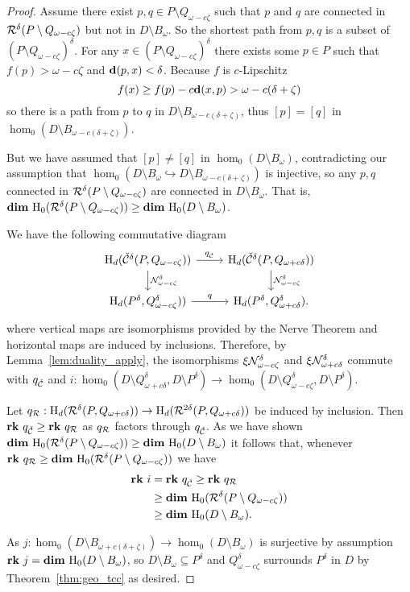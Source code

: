 \begin{proof}
  Assume there exist $p,q \in P\setminus Q_{\omega-c\zeta}$ such that $p$ and $q$ are connected in $\mathcal{R}^\delta(P\setminus Q_{\omega-c\zeta})$ but not in $D\setminus B_\omega$.
  So the shortest path from $p, q$ is a subset of $(P\setminus Q_{\omega-c\zeta})^\delta$.
  For any $x\in (P\setminus Q_{\omega-c\zeta})^\delta$ there exists some $p\in P$ such that $f(p) > \omega - c\zeta$ and $\mathbf{d}(p,x) < \delta$.
  Because $f$ is $c$-Lipschitz
  \[ f(x)\geq f(p) - c\mathbf{d}(x,p) > \omega - c(\delta+\zeta)\]
  so there is a path from $p$ to $q$ in $D\setminus B_{\omega-c(\delta+\zeta)}$, thus $[p] = [q]$ in $\hom_0(D\setminus B_{\omega-c(\delta+\zeta)})$.

  But we have assumed that $[p]\neq[q]$ in $\hom_0(D\setminus B_\omega)$, contradicting our assumption that $\hom_0(D\setminus B_\omega\hookrightarrow D\setminus B_{\omega-c(\delta+\zeta)})$ is injective, so any $p,q$ connected in $\mathcal{R}^\delta(P\setminus Q_{\omega-c\zeta})$ are connected in $D\setminus B_\omega$.
  That is, $\mathbf{dim}~\mathrm{H}_0(\mathcal{R}^\delta(P\setminus Q_{\omega-c\zeta}))\geq \mathbf{dim}~\mathrm{H}_0(D\setminus B_\omega)$.

  We have the following commutative diagram
  \[\begin{tikzcd}
    \hom_d(\cech^\delta(P, Q_{\omega-c\zeta})) \arrow{r}{q_{\cech}}\arrow{d}{\N_{\omega-c\zeta}^{\delta}} &
    \hom_d(\cech^\delta(P, Q_{\omega+c\delta})) \arrow{d}{\N_{\omega-c\zeta}^\delta}\\
    \hom_d(P^\delta, Q_{\omega-c\zeta}^\delta))\arrow{r}{q} &
    \hom_d(P^\delta, Q_{\omega+c\delta}^\delta).
  \end{tikzcd}\]
  where vertical maps are isomorphisms provided by the Nerve Theorem and horizontal maps are induced by inclusions.
  Therefore, by Lemma~\ref{lem:duality_apply}, the isomorphisms $\xi\mathcal{N}_{\omega-c\zeta}^\delta$ and $\xi\mathcal{N}_{\omega+c\delta}^\delta$ commute with $q_{\check{\mathcal{C}}}$ and $i : \hom_0(D\setminus Q_{\omega+c\delta}^\delta, D\setminus P^\delta)\to \hom_0(D\setminus Q_{\omega-c\zeta}^\delta, D\setminus P^\delta)$.

  Let $q_{\mathcal{R}} : \mathrm{H}_d(\mathcal{R}^{\delta}(P, Q_{\omega+c\delta}))\to\mathrm{H}_d(\mathcal{R}^{2\delta}(P, Q_{\omega+c\delta}))$ be induced by inclusion.
  Then $\mathbf{rk}~q_{\check{\mathcal{C}}} \geq\mathbf{rk}~q_{\mathcal{R}}$ as $q_{\mathcal{R}}$ factors through $q_{\check{\mathcal{C}}}$.
  As we have shown $\mathbf{dim}~\mathrm{H}_0(\mathcal{R}^\delta(P\setminus Q_{\omega-c\zeta}))\geq \mathbf{dim}~\mathrm{H}_0(D\setminus B_\omega)$ it follows that, whenever $\mathbf{rk}~q_{\mathcal{R}} \geq \mathbf{dim}~\mathrm{H}_0(\mathcal{R}^\delta(P\setminus Q_{\omega-c\zeta}))$ we have
  \begin{align*}
    \mathbf{rk}~i &= \mathbf{rk}~q_{\check{\mathcal{C}}} \geq \mathbf{rk}~q_{\mathcal{R}}\\
      &\geq \mathbf{dim}~\mathrm{H}_0(\mathcal{R}^\delta(P\setminus Q_{\omega-c\zeta}))\\
      &\geq \mathbf{dim}~\mathrm{H}_0(D\setminus B_\omega).
  \end{align*}

  As $j : \hom_0(D\setminus B_{\omega+c(\delta+\zeta)})\to \hom_0(D\setminus B_\omega)$ is surjective by assumption $\mathbf{rk}~j = \mathbf{dim}~\mathrm{H}_0(D\setminus B_\omega)$, so $D\setminus B_\omega\subseteq P^\delta$ and $Q_{\omega-c\zeta}^\delta$ surrounds $P^\delta$ in $D$ by Theorem~\ref{thm:geo_tcc} as desired.
\end{proof}
